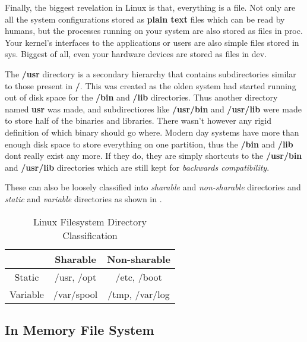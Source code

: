 Finally, the biggest revelation in Linux is that, everything is a file.
Not only are all the system configurations stored as \textbf{plain text} files which can be read by humans, but the processes running on your system are also stored as files in proc.
Your kernel's interfaces to the applications or users are also simple files stored in sys.
Biggest of all, even your hardware devices are stored as files in dev.

The \textbf{/usr} directory is a secondary hierarchy that contains subdirectories similar to those present in \textbf{/}.
This was created as the olden system had started running out of disk space for the \textbf{/bin} and \textbf{/lib} directories.
Thus another directory named \textbf{usr} was made, and subdirectiores like \textbf{/usr/bin} and \textbf{/usr/lib} were made to store half of the binaries and libraries.
There wasn't however any rigid definition of which binary should go where.
Modern day systems have more than enough disk space to store everything on one partition, thus the \textbf{/bin} and \textbf{/lib} dont really exist any more. If they do, they are simply shortcuts
to the \textbf{/usr/bin} and \textbf{/usr/lib} directories which are still kept for \textit{backwards compatibility}.

These can also be loosely classified into \textit{sharable} and \textit{non-sharable} directories and \textit{static} and \textit{variable} directories as shown in .

\begin{table}[h!]
\caption{Linux Filesystem Directory Classification}
\begin{tabular}{ c | c c }
  \toprule
  & Sharable & Non-sharable \\
 \midrule
  Static & /usr, /opt & /etc, /boot \\
  Variable & /var/spool & /tmp, /var/log \\
 \bottomrule
\end{tabular}
\end{table}

\subsection{In Memory File System}

